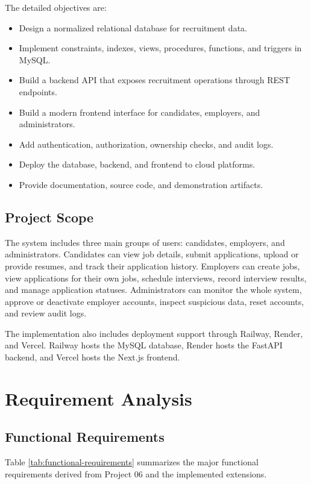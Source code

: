 \documentclass[12pt,a4paper]{report}
\begin{document}
The detailed objectives are:

\begin{itemize}[leftmargin=1.5cm]
  \item Design a normalized relational database for recruitment data.
  \item Implement constraints, indexes, views, procedures, functions, and triggers in MySQL.
  \item Build a backend API that exposes recruitment operations through REST endpoints.
  \item Build a modern frontend interface for candidates, employers, and administrators.
  \item Add authentication, authorization, ownership checks, and audit logs.
  \item Deploy the database, backend, and frontend to cloud platforms.
  \item Provide documentation, source code, and demonstration artifacts.
\end{itemize}

\section{Project Scope}

The system includes three main groups of users: candidates, employers, and administrators. Candidates can view job details, submit applications, upload or provide resumes, and track their application history. Employers can create jobs, view applications for their own jobs, schedule interviews, record interview results, and manage application statuses. Administrators can monitor the whole system, approve or deactivate employer accounts, inspect suspicious data, reset accounts, and review audit logs.

The implementation also includes deployment support through Railway, Render, and Vercel. Railway hosts the MySQL database, Render hosts the FastAPI backend, and Vercel hosts the Next.js frontend.

\chapter{Requirement Analysis}

\section{Functional Requirements}

Table \ref{tab:functional-requirements} summarizes the major functional requirements derived from Project 06 and the implemented extensions.
\end{document}
